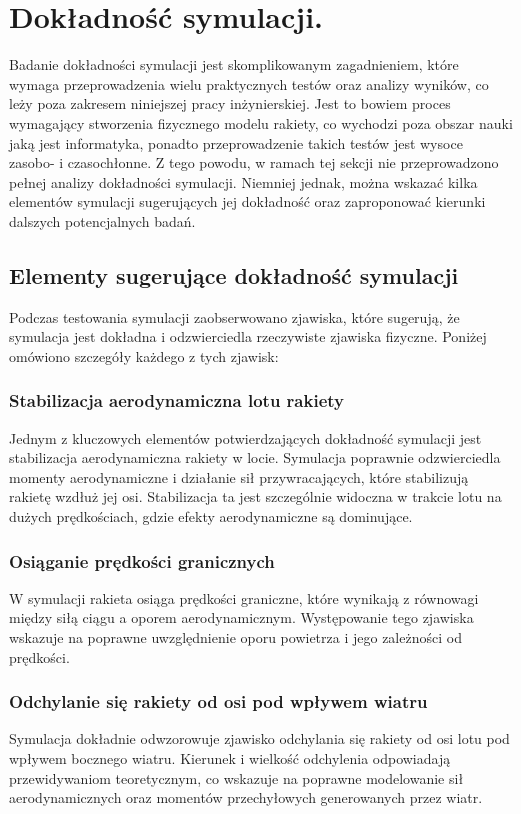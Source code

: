 \section{Dokładność symulacji.}\label{sec:dokadnosc-symulacji}

Badanie dokładności symulacji jest skomplikowanym zagadnieniem, które wymaga
przeprowadzenia wielu praktycznych testów oraz analizy wyników, co leży poza
zakresem niniejszej pracy inżynierskiej. Jest to bowiem proces wymagający
stworzenia fizycznego modelu rakiety, co wychodzi poza obszar nauki jaką
jest informatyka, ponadto przeprowadzenie takich testów jest wysoce zasobo- i
czasochłonne. Z
tego
powodu, w
ramach tej sekcji nie przeprowadzono pełnej analizy dokładności symulacji.
Niemniej jednak, można wskazać kilka
elementów symulacji sugerujących jej dokładność oraz zaproponować kierunki
dalszych potencjalnych badań.

\subsection{Elementy sugerujące dokładność symulacji}

Podczas testowania symulacji zaobserwowano zjawiska, które sugerują, że symulacja jest dokładna i odzwierciedla rzeczywiste zjawiska fizyczne. Poniżej omówiono szczegóły każdego z tych zjawisk:

\subsubsection{Stabilizacja aerodynamiczna lotu rakiety}
Jednym z kluczowych elementów potwierdzających dokładność symulacji jest stabilizacja aerodynamiczna rakiety w locie. Symulacja poprawnie odzwierciedla momenty aerodynamiczne i działanie sił przywracających, które stabilizują rakietę wzdłuż jej osi. Stabilizacja ta jest szczególnie widoczna w trakcie lotu na dużych prędkościach, gdzie efekty aerodynamiczne są dominujące.

\subsubsection{Osiąganie prędkości granicznych}
W symulacji rakieta osiąga prędkości graniczne, które wynikają z równowagi
między siłą ciągu a oporem aerodynamicznym. Występowanie tego zjawiska
wskazuje na poprawne uwzględnienie oporu powietrza i jego zależności od prędkości.

\subsubsection{Odchylanie się rakiety od osi pod wpływem wiatru}
Symulacja dokładnie odwzorowuje zjawisko odchylania się rakiety od osi lotu
pod wpływem bocznego wiatru. Kierunek i wielkość odchylenia odpowiadają
przewidywaniom teoretycznym, co wskazuje na poprawne modelowanie sił
aerodynamicznych oraz momentów przechyłowych generowanych przez wiatr.

